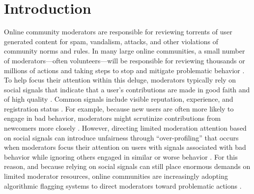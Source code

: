 \documentclass[format=acmsmall, natbib=true,  screen=true]{acmart}
\begin{document}


\maketitle

\section{Introduction}


Online community moderators are responsible for reviewing torrents of user generated content for spam, vandalism, attacks, and other violations of community norms and rules.  In many large online communities, a small number of moderators---often volunteers---will be responsible for reviewing thousands or millions of actions and taking steps to stop and mitigate problematic behavior \cite{gillespie_custodians_2018}. To help focus their attention within this deluge, moderators typically rely on social signals \cite{donath_social_2014} that indicate that a user's contributions are made in good faith and of high quality \citep{kraut_building_2012}. Common signals include visible reputation, experience, and registration status \cite{broughton_wikipedia_2008, kraut_building_2012}. 
For example, because new users are often more likely to engage in bad behavior, moderators might scrutinize contributions from newcomers more closely \citep{kraut_building_2012,potthast_automatic_2008}.
However, directing limited moderation attention based on social signals can introduce unfairness through ``over-profiling'' that occurs when moderators focus their attention on users with signals associated with bad behavior while ignoring others engaged in similar or worse behavior \cite{de_laat_profiling_2016}. 
For this reason, and because relying on social signals can still place enormous demands on limited moderator resources, online communities are increasingly adopting algorithmic flagging systems to direct moderators toward problematic actions \cite{chandrasekharan_crossmod:_2019, halfaker_ores:_2019}.
\end{document}
